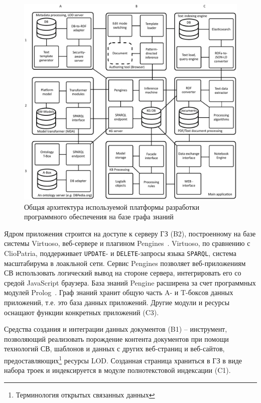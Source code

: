 \documentclass[
]{aiitart}
\begin{document}
\begin{figure}
\centering
\includegraphics[width=1\linewidth]{architecture-mda-lod-ext-general.pdf}
\caption{Общая архитектура используемой платформы разработки программного обеспечения на базе графа знаний}
\label{fig:arch}
\end{figure}

Ядром приложения строится на доступе к серверу ГЗ (B2), построенному на базе системы Virtuoso, веб-сервере и плагином Pengines~\cite{pengines}. Virtuoso, по сравнению с ClioPatria, поддерживает \verb|UPDATE|- и \verb|DELETE|-запросы языка \verb|SPARQL|, система масштабирума в лоакльной сети. Сервис Pengines позволяет веб-приложениям СВ использовать логический вывод на стороне сервера, интегрировать его со средой JavaScript браузера. База знаний Pengine расширена за счет программных модулей Prolog~\cite{b10,swi}. Граф знаний хранит общую часть A- и T-боксов данных приложений, т.е. это база данных приложений. Другие модули и ресурсы оснащают функции конкретных приложений (C3).

Средства создания и интеграции данных документов (B1) -- инструмент, позволяющий реализовать порождение контента документов при помощи технологий СВ, шаблонов и данных с других веб-страниц и веб-сайтов, предоставляющих\footnote{Терминология открытых связанных данных} \cite{b1,c6} ресурсы LOD. Созданная страница храниться в ГЗ в виде набора троек и индексируется в модуле полнотекстовой индексации (C1).
\end{document}
